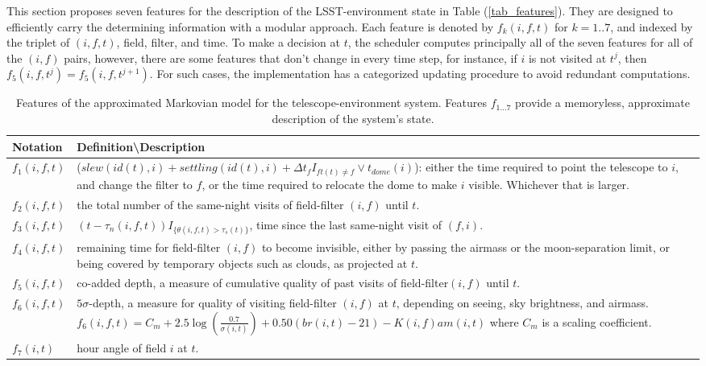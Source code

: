 \documentclass[12pt]{aastex62}
\theoremstyle{definition}
\begin{document}
This section proposes seven features for the description of the LSST-environment state in Table (\ref{tab_features}). They are designed to efficiently carry the determining information with a modular approach. Each feature is denoted by $f_k(i,f,t)$ for $k= 1..7$, and indexed by the triplet of $(i,f,t)$, field, filter, and time. To make a decision at $t$, the scheduler computes principally all of the seven features for all of the $(i,f)$ pairs, however, there are some features that don't change in every time step, for instance, if $i$ is not visited at $t^j$, then $f_5(i,f,t^j)= f_5(i,f,t^{j+1})$. For such cases, the implementation has a categorized updating procedure to avoid redundant computations.

\begin{table}
\caption{Features of the approximated Markovian model for the telescope-environment system. Features $f_{1\dots 7}$ provide a memoryless, approximate description of the system's state.}
\begin{tabularx}{\textwidth}{|l|X|}
\hline
Notation & Definition\textbackslash Description\\ \hline \hline 
$f_1(i,f,t)$ & ($slew(id(t),i)+settling(id(t),i)+\Delta t_{f} I_{ft(t) \neq f} \vee t_{dome}(i)$): either the time required to point the telescope to $i$, and change the filter to $f$, or the time required to relocate the dome to make $i$ visible. Whichever that is larger.\\ \hline
$f_2(i,f,t)$ &  the total number of the same-night visits of field-filter $(i,f)$ until $t$.\\ \hline
$f_3(i,f,t)$ &  $(t - \tau_n(i,f,t)) I_{\{\theta(i,f,t) > \tau_s(t)\}}$, time since the last same-night visit of $(f,i).$\\ \hline
$f_4(i,f,t)$ &  remaining time for field-filter $(i,f)$ to become invisible, either by passing the airmass or the moon-separation limit, or being covered by temporary objects such as clouds, as projected at $t$.\\ \hline
$f_5(i,f,t)$ &  co-added depth, a measure of cumulative quality of past visits of field-filter$(i,f)$ until $t$.\\ \hline
$f_6(i,f,t)$ &  $5\sigma$-depth, a measure for quality of visiting field-filter $(i,f)$ at $t$, depending on seeing, sky brightness, and airmass. $f_6(i,f,t) = C_m + 2.5 \log (\frac{0.7}{\sigma(i,t)}) + 0.50 (br(i,t)-21) - K(i,f) am(i,t)$ where $C_m$ is a scaling coefficient.\\ \hline
$f_7(i,t)$  & hour angle of field $i$ at $t$.\\ \hline
\hline
\end{tabularx}
\end{table}\label{tab_features}
\end{document}
